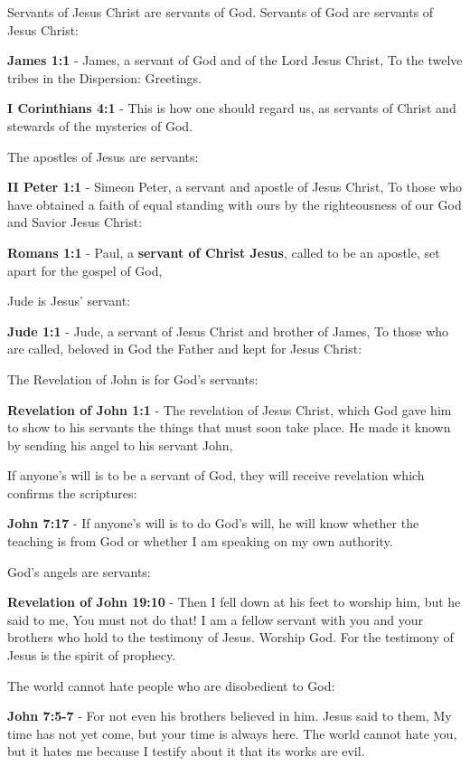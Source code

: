 \documentclass[11pt]{article}
\begin{document}
Servants of Jesus Christ are servants of God. Servants of God are servants of Jesus Christ:

\textbf{James 1:1} - James, a servant of God and of the Lord Jesus Christ, To the twelve tribes in the Dispersion: Greetings.

\textbf{I Corinthians 4:1} - This is how one should regard us, as servants of Christ and stewards of the mysteries of God.

The apostles of Jesus are servants:

\textbf{II Peter 1:1} - Simeon Peter, a servant and apostle of Jesus Christ, To those who have obtained a faith of equal standing with ours by the righteousness of our God and Savior Jesus Christ:

\textbf{Romans 1:1} - Paul, a \textbf{servant of Christ Jesus}, called to be an apostle, set apart for the gospel of God,

Jude is Jesus' servant:

\textbf{Jude 1:1} - Jude, a servant of Jesus Christ and brother of James, To those who are called, beloved in God the Father and kept for Jesus Christ:

The Revelation of John is for God's servants:

\textbf{Revelation of John 1:1} - The revelation of Jesus Christ, which God gave him to show to his servants the things that must soon take place. He made it known by sending his angel to his servant John,

If anyone's will is to be a servant of God, they will receive revelation which confirms the scriptures:

\textbf{John 7:17} - If anyone's will is to do God's will, he will know whether the teaching is from God or whether I am speaking on my own authority.

God's angels are servants:

\textbf{Revelation of John 19:10} - Then I fell down at his feet to worship him, but he said to me, You must not do that! I am a fellow servant with you and your brothers who hold to the testimony of Jesus. Worship God. For the testimony of Jesus is the spirit of prophecy.

The world cannot hate people who are disobedient to God:

\textbf{John 7:5-7} - For not even his brothers believed in him. Jesus said to them, My time has not yet come, but your time is always here. The world cannot hate you, but it hates me because I testify about it that its works are evil.
\end{document}
